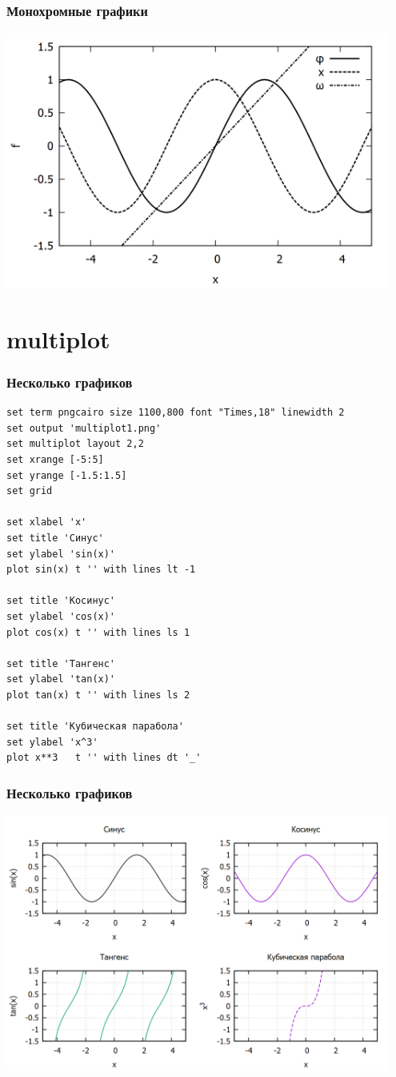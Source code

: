 \documentclass[12pt, compress]{beamer}
\begin{document}
\begin{frame}[t,fragile]
\frametitle{Монохромные графики}
\includegraphics[width=0.95\textwidth]{./gp/custom_lines_style_dashed.png}
\end{frame}

%
%
%
\section{multiplot}
%
%
%

\begin{frame}[t,fragile]
\frametitle{Несколько графиков}
\begin{lstlisting}[basicstyle={\scriptsize}]
set term pngcairo size 1100,800 font "Times,18" linewidth 2
set output 'multiplot1.png'
set multiplot layout 2,2
set xrange [-5:5]
set yrange [-1.5:1.5]
set grid 

set xlabel 'x'
set title 'Синус'
set ylabel 'sin(x)'
plot sin(x) t '' with lines lt -1

set title 'Косинус'
set ylabel 'cos(x)'
plot cos(x) t '' with lines ls 1 

set title 'Тангенс'
set ylabel 'tan(x)'
plot tan(x) t '' with lines ls 2 

set title 'Кубическая парабола'
set ylabel 'x^3'
plot x**3   t '' with lines dt '_' 
\end{lstlisting}
\end{frame}


\begin{frame}[t,fragile]
\frametitle{Несколько графиков}
{\centering
\includegraphics[width=0.95\textwidth]{./gp/multiplot1.png}  
}
\end{frame}
\end{document}
